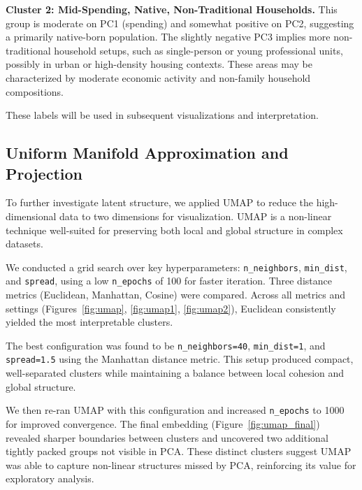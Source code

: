 \documentclass{article}
\begin{document}
\textbf{Cluster 2: Mid-Spending, Native, Non-Traditional Households.}  
This group is moderate on PC1 (spending) and somewhat positive on PC2, suggesting a primarily native-born population. The slightly negative PC3 implies more non-traditional household setups, such as single-person or young professional units, possibly in urban or high-density housing contexts. These areas may be characterized by moderate economic activity and non-family household compositions.

These labels will be used in subsequent visualizations and interpretation.

\subsection{Uniform Manifold Approximation and Projection}

To further investigate latent structure, we applied UMAP to reduce the high-dimensional data to two dimensions for visualization. UMAP is a non-linear technique well-suited for preserving both local and global structure in complex datasets.

We conducted a grid search over key hyperparameters: \texttt{n\_neighbors}, \texttt{min\_dist}, and \texttt{spread}, using a low \texttt{n\_epochs} of 100 for faster iteration. Three distance metrics (Euclidean, Manhattan, Cosine) were compared. Across all metrics and settings (Figures~\ref{fig:umap}, \ref{fig:umap1}, \ref{fig:umap2}), Euclidean consistently yielded the most interpretable clusters.

The best configuration was found to be \texttt{n\_neighbors=40}, \texttt{min\_dist=1}, and \texttt{spread=1.5} using the Manhattan distance metric. This setup produced compact, well-separated clusters while maintaining a balance between local cohesion and global structure.

We then re-ran UMAP with this configuration and increased \texttt{n\_epochs} to 1000 for improved convergence. The final embedding (Figure~\ref{fig:umap_final}) revealed sharper boundaries between clusters and uncovered two additional tightly packed groups not visible in PCA. These distinct clusters suggest UMAP was able to capture non-linear structures missed by PCA, reinforcing its value for exploratory analysis.
\end{document}
